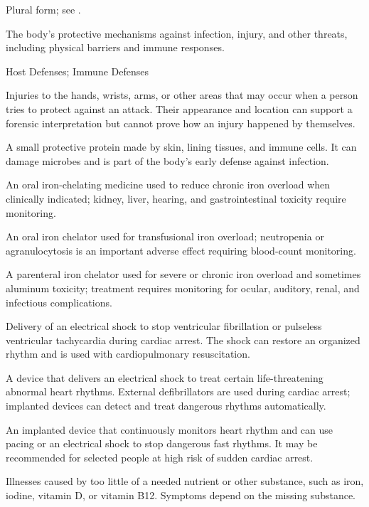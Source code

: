  Plural form; see .

 The body’s protective mechanisms against infection, injury, and other threats, including physical barriers and immune responses.

\synonyms
Host Defenses; Immune Defenses

 Injuries to the hands, wrists, arms, or other areas that may occur when a person tries to protect against an attack. Their appearance and location can support a forensic interpretation but cannot prove how an injury happened by themselves.

 A small protective protein made by skin, lining tissues, and immune cells. It can damage microbes and is part of the body’s early defense against infection.

 An oral iron-chelating medicine used to reduce chronic iron overload when clinically indicated; kidney, liver, hearing, and gastrointestinal toxicity require monitoring.

 An oral iron chelator used for transfusional iron overload; neutropenia or agranulocytosis is an important adverse effect requiring blood-count monitoring.

 A parenteral iron chelator used for severe or chronic iron overload and sometimes aluminum toxicity; treatment requires monitoring for ocular, auditory, renal, and infectious complications.

 Delivery of an electrical shock to stop ventricular fibrillation or pulseless ventricular tachycardia during cardiac arrest. The shock can restore an organized rhythm and is used with cardiopulmonary resuscitation.

 A device that delivers an electrical shock to treat certain life-threatening abnormal heart rhythms. External defibrillators are used during cardiac arrest; implanted devices can detect and treat dangerous rhythms automatically.

 An implanted device that continuously monitors heart rhythm and can use pacing or an electrical shock to stop dangerous fast rhythms. It may be recommended for selected people at high risk of sudden cardiac arrest.

 Illnesses caused by too little of a needed nutrient or other substance, such as iron, iodine, vitamin D, or vitamin B12. Symptoms depend on the missing substance.

